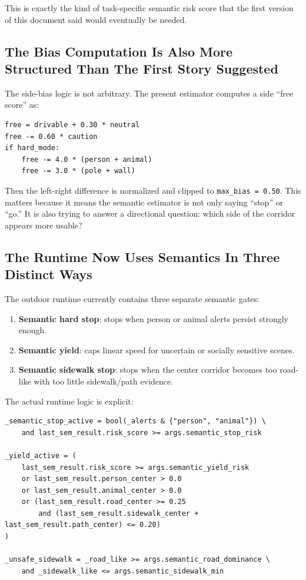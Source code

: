 \documentclass[11pt]{article}
\begin{document}
This is exactly the kind of task-specific semantic risk score that the first version of this document said would eventually be needed.

\subsection{The Bias Computation Is Also More Structured Than The First Story Suggested}
The side-bias logic is not arbitrary. The present estimator computes a side ``free score'' as:
\begin{verbatim}
free = drivable + 0.30 * neutral
free -= 0.60 * caution
if hard_mode:
    free -= 4.0 * (person + animal)
    free -= 3.0 * (pole + wall)
\end{verbatim}

Then the left-right difference is normalized and clipped to \texttt{max\_bias = 0.50}. This matters because it means the semantic estimator is not only saying ``stop'' or ``go.'' It is also trying to answer a directional question: which side of the corridor appears more usable?

\subsection{The Runtime Now Uses Semantics In Three Distinct Ways}
The outdoor runtime currently contains three separate semantic gates:
\begin{enumerate}[leftmargin=*]
\item \textbf{Semantic hard stop}: stops when person or animal alerts persist strongly enough.
\item \textbf{Semantic yield}: caps linear speed for uncertain or socially sensitive scenes.
\item \textbf{Semantic sidewalk stop}: stops when the center corridor becomes too road-like with too little sidewalk/path evidence.
\end{enumerate}

The actual runtime logic is explicit:
\begin{verbatim}
_semantic_stop_active = bool(_alerts & {"person", "animal"}) \
    and last_sem_result.risk_score >= args.semantic_stop_risk

_yield_active = (
    last_sem_result.risk_score >= args.semantic_yield_risk
    or last_sem_result.person_center > 0.0
    or last_sem_result.animal_center > 0.0
    or (last_sem_result.road_center >= 0.25
        and (last_sem_result.sidewalk_center + last_sem_result.path_center) <= 0.20)
)

_unsafe_sidewalk = _road_like >= args.semantic_road_dominance \
    and _sidewalk_like <= args.semantic_sidewalk_min
\end{verbatim}
\end{document}

